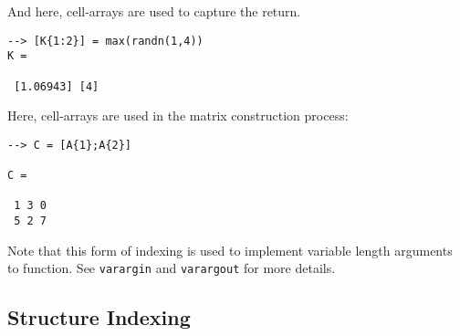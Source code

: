 And here, cell-arrays are used to capture the return.
\begin{verbatim}
--> [K{1:2}] = max(randn(1,4))
K = 

 [1.06943] [4] 
\end{verbatim}
Here, cell-arrays are used in the matrix construction process:
\begin{verbatim}
--> C = [A{1};A{2}]

C = 

 1 3 0 
 5 2 7 
\end{verbatim}
Note that this form of indexing is used to implement variable
length arguments to function.  See \verb|varargin| and \verb|varargout|
for more details.
\subsection{Structure Indexing}


